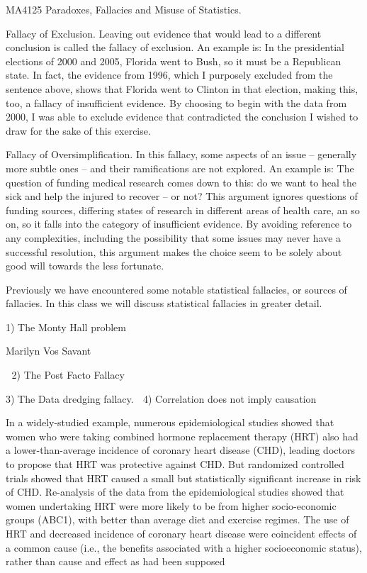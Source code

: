 MA4125 Paradoxes, Fallacies and Misuse of Statistics.

 

Fallacy of Exclusion. Leaving out evidence that would lead to a different conclusion is called the fallacy of exclusion. An example is: In the presidential elections of 2000 and 2005, Florida went to Bush, so it must be a Republican state. In fact, the evidence from 1996, which I purposely excluded from the sentence above, shows that Florida went to Clinton in that election, making this, too, a fallacy of insufficient evidence. By choosing to begin with the data from 2000, I was able to exclude evidence that contradicted the conclusion I wished to draw for the sake of this exercise.
 
Fallacy of Oversimplification.
In this fallacy, some aspects of an issue -- generally more subtle ones -- and their ramifications are not explored. An example is: The question of funding medical research comes down to this: do we want to heal the sick and help the injured to recover -- or not? This argument ignores questions of funding sources, differing states of research in different areas of health care, an so on, so it falls into the category of insufficient evidence. By avoiding reference to any complexities, including the possibility that some issues may never have a successful resolution, this argument makes the choice seem to be solely about good will towards the less fortunate.





Previously we have encountered some notable statistical fallacies, or sources of fallacies. In this class we will discuss statistical fallacies in greater detail.



1) The Monty Hall problem

Marilyn Vos Savant


2) The Post Facto Fallacy

3) The Data dredging fallacy.

4) Correlation does not imply causation

In a widely-studied example, numerous epidemiological studies showed that women who were taking combined hormone replacement therapy (HRT) also had a lower-than-average incidence of coronary heart disease (CHD), leading doctors to propose that HRT was protective against CHD. But randomized controlled trials showed that HRT caused a small but statistically significant increase in risk of CHD. Re-analysis of the data from the epidemiological studies showed that women undertaking HRT were more likely to be from higher socio-economic groups (ABC1), with better than average diet and exercise regimes. The use of HRT and decreased incidence of coronary heart disease were coincident effects of a common cause (i.e., the benefits associated with a higher socioeconomic status), rather than cause and effect as had been supposed

